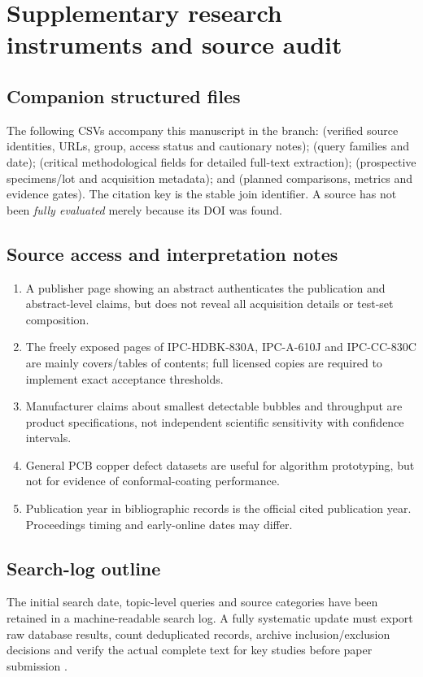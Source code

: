 \section{Supplementary research instruments and source audit}
\subsection{Companion structured files}
The following CSVs accompany this manuscript in the branch:  (verified source identities, URLs, group, access status and cautionary notes);  (query families and date);  (critical methodological fields for detailed full-text extraction);  (prospective specimens/lot and acquisition metadata); and  (planned comparisons, metrics and evidence gates). The citation key is the stable join identifier. A source has not been \emph{fully evaluated} merely because its DOI was found.

\subsection{Source access and interpretation notes}
\begin{enumerate}[leftmargin=*]
\item A publisher page showing an abstract authenticates the publication and abstract-level claims, but does not reveal all acquisition details or test-set composition.
\item The freely exposed pages of IPC-HDBK-830A, IPC-A-610J and IPC-CC-830C are mainly covers/tables of contents; full licensed copies are required to implement exact acceptance thresholds.
\item Manufacturer claims about smallest detectable bubbles and throughput are product specifications, not independent scientific sensitivity with confidence intervals.
\item General PCB copper defect datasets are useful for algorithm prototyping, but not for evidence of conformal-coating performance.
\item Publication year in bibliographic records is the official cited publication year. Proceedings timing and early-online dates may differ.
\end{enumerate}

\subsection{Search-log outline}
The initial search date, topic-level queries and source categories have been retained in a machine-readable search log. A fully systematic update must export raw database results, count deduplicated records, archive inclusion/exclusion decisions and verify the actual complete text for key studies before paper submission \citep{page2021prisma}.

